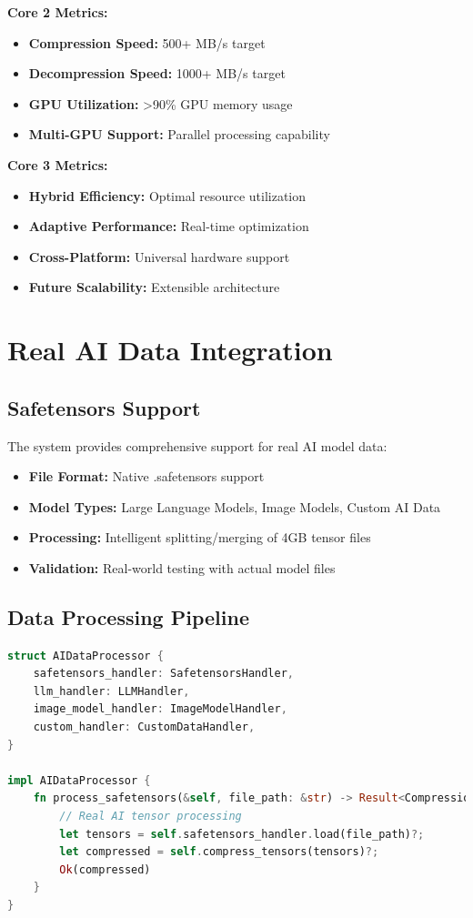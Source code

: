 \documentclass[12pt,a4paper]{article}
\begin{document}
\textbf{Core 2 Metrics:}
\begin{itemize}
    \item \textbf{Compression Speed:} 500+ MB/s target
    \item \textbf{Decompression Speed:} 1000+ MB/s target
    \item \textbf{GPU Utilization:} >90\% GPU memory usage
    \item \textbf{Multi-GPU Support:} Parallel processing capability
\end{itemize}

\textbf{Core 3 Metrics:}
\begin{itemize}
    \item \textbf{Hybrid Efficiency:} Optimal resource utilization
    \item \textbf{Adaptive Performance:} Real-time optimization
    \item \textbf{Cross-Platform:} Universal hardware support
    \item \textbf{Future Scalability:} Extensible architecture
\end{itemize}

\section{Real AI Data Integration}

\subsection{Safetensors Support}

The system provides comprehensive support for real AI model data:

\begin{itemize}
    \item \textbf{File Format:} Native .safetensors support
    \item \textbf{Model Types:} Large Language Models, Image Models, Custom AI Data
    \item \textbf{Processing:} Intelligent splitting/merging of 4GB tensor files
    \item \textbf{Validation:} Real-world testing with actual model files
\end{itemize}

\subsection{Data Processing Pipeline}

\begin{lstlisting}[language=Rust, caption=AI Data Processing]
struct AIDataProcessor {
    safetensors_handler: SafetensorsHandler,
    llm_handler: LLMHandler,
    image_model_handler: ImageModelHandler,
    custom_handler: CustomDataHandler,
}

impl AIDataProcessor {
    fn process_safetensors(&self, file_path: &str) -> Result<CompressionResult> {
        // Real AI tensor processing
        let tensors = self.safetensors_handler.load(file_path)?;
        let compressed = self.compress_tensors(tensors)?;
        Ok(compressed)
    }
}
\end{lstlisting}
\end{document}
